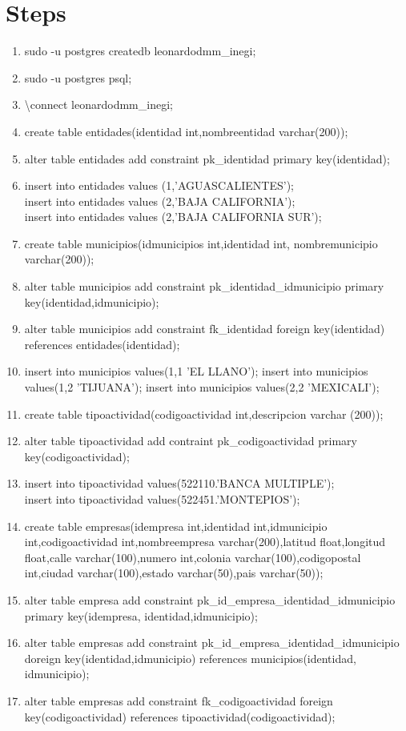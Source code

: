 \documentclass[10pt]{article}         %
\begin{document}
\section{Steps}
\begin{enumerate}

\item
	sudo -u postgres createdb leonardodmm\_inegi;
\item
	sudo -u postgres psql;
\item
	\textbackslash connect leonardodmm\_inegi;
\item
	create table entidades(identidad int,nombreentidad varchar(200));
\item
	alter table entidades add constraint pk\_identidad primary key(identidad);
\item
	insert into entidades values (1,'AGUASCALIENTES');\\
	insert into entidades values (2,'BAJA CALIFORNIA');\\
	insert into entidades values (2,'BAJA CALIFORNIA SUR');
\item
	create table municipios(idmunicipios int,identidad int, nombremunicipio varchar(200));
\item
	alter table municipios add constraint pk\_identidad\_idmunicipio primary key(identidad,idmunicipio);
\item
	alter table municipios add constraint fk\_identidad foreign key(identidad) references entidades(identidad);
\item
	insert into municipios values(1,1 'EL LLANO');
	insert into municipios values(1,2 'TIJUANA');
	insert into municipios values(2,2 'MEXICALI');
\item
	create table tipoactividad(codigoactividad int,descripcion varchar (200));
\item
	alter table tipoactividad add contraint pk\_codigoactividad primary key(codigoactividad);
\item	
	 insert into tipoactividad values(522110.'BANCA MULTIPLE');\\
	 insert into tipoactividad values(522451.'MONTEPIOS');
\item
	create table empresas(idempresa int,identidad int,idmunicipio int,codigoactividad int,nombreempresa varchar(200),latitud float,longitud float,calle varchar(100),numero int,colonia varchar(100),codigopostal int,ciudad varchar(100),estado varchar(50),pais varchar(50));
\item
	alter table empresa add constraint pk\_id\_empresa\_identidad\_idmunicipio primary key(idempresa, identidad,idmunicipio);
\item
	alter table empresas add constraint pk\_id\_empresa\_identidad\_idmunicipio doreign key(identidad,idmunicipio) references municipios(identidad, idmunicipio);
\item
alter table empresas add constraint fk\_codigoactividad foreign key(codigoactividad) references tipoactividad(codigoactividad);	
	
\end{enumerate}
\end{document}
